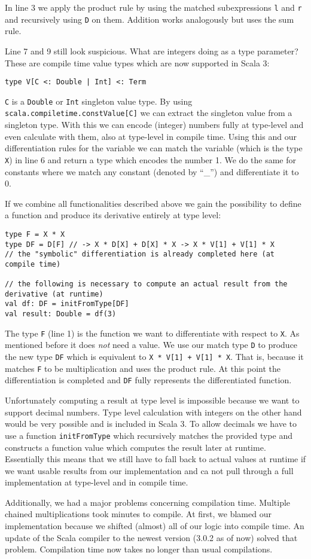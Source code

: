 In line 3 we apply the product rule by using the matched subexpressions \lstinline{l} and \lstinline{r} and recursively using \lstinline{D} on them. Addition works analogously but uses the sum rule.

Line 7 and 9 still look suspicious. What are integers doing as a type parameter? These are compile time value types which are now supported in Scala 3:
\begin{lstlisting}
type V[C <: Double | Int] <: Term
\end{lstlisting}
\lstinline{C} is a \lstinline{Double} or \lstinline{Int} singleton value type. By using \lstinline{scala.compiletime.constValue[C]} we can extract the singleton value from a singleton type. With this we can encode (integer) numbers fully at type-level and even calculate with them, also at type-level in compile time. Using this and our differentiation rules for the variable we can match the variable (which is the type \lstinline{X}) in line 6 and return a type which encodes the number 1. We do the same for constants where we match any constant (denoted by ``\_'') and differentiate it to 0.

If we combine all functionalities described above we gain the possibility to define a function and produce its derivative entirely at type level:
\begin{lstlisting}
type F = X * X
type DF = D[F] // -> X * D[X] + D[X] * X -> X * V[1] + V[1] * X
// the "symbolic" differentiation is already completed here (at compile time)

// the following is necessary to compute an actual result from the derivative (at runtime)
val df: DF = initFromType[DF] 
val result: Double = df(3)
\end{lstlisting}
The type \lstinline{F} (line 1) is the function we want to differentiate with respect to \lstinline{X}. As mentioned before it does \emph{not} need a value. We use our match type \lstinline{D} to produce the new type \lstinline{DF} which is equivalent to \lstinline{X * V[1] + V[1] * X}. That is, because it matches \lstinline{F} to be multiplication and uses the product rule. At this point the differentiation is completed and \lstinline{DF} fully represents the differentiated function.

Unfortunately computing a result at type level is impossible because we want to support decimal numbers. Type level calculation with integers on the other hand would be very possible and is included in Scala 3. To allow decimals we have to use a function \lstinline{initFromType} which recursively matches the provided type and constructs a function value which computes the result later at runtime. Essentially this means that we still have to fall back to actual values at runtime if we want usable results from our implementation and ca not pull through a full implementation at type-level and in compile time.

Additionally, we had a major problems concerning compilation time. Multiple chained multiplications took minutes to compile. At first, we blamed our implementation because we shifted (almost) all of our logic into compile time. An update of the Scala compiler to the newest version (3.0.2 as of now) solved that problem. Compilation time now takes no longer than usual compilations.

